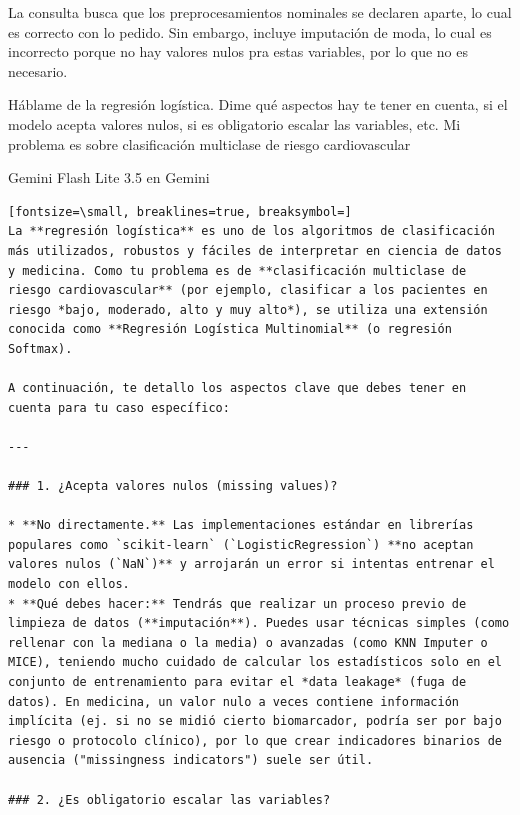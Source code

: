 \documentclass[12pt,a4paper,oneside]{book}
\begin{document}
\begin{iaanalisis}
La consulta busca que los preprocesamientos nominales se declaren aparte, lo cual es correcto con lo pedido. Sin embargo, incluye imputación de moda, lo cual es incorrecto porque no hay valores nulos pra estas variables, por lo que no es necesario.
\end{iaanalisis}




\begin{iaprompt}
Háblame de la regresión logística. Dime qué aspectos hay te tener en cuenta, si el modelo acepta valores nulos, si es obligatorio escalar las variables, etc. Mi problema es sobre clasificación multiclase de riesgo cardiovascular
\end{iaprompt}
\begin{iaresp}{Gemini Flash Lite 3.5 en Gemini}
\begin{Verbatim}[fontsize=\small, breaklines=true, breaksymbol=]
La **regresión logística** es uno de los algoritmos de clasificación más utilizados, robustos y fáciles de interpretar en ciencia de datos y medicina. Como tu problema es de **clasificación multiclase de riesgo cardiovascular** (por ejemplo, clasificar a los pacientes en riesgo *bajo, moderado, alto y muy alto*), se utiliza una extensión conocida como **Regresión Logística Multinomial** (o regresión Softmax).

A continuación, te detallo los aspectos clave que debes tener en cuenta para tu caso específico:

---

### 1. ¿Acepta valores nulos (missing values)?

* **No directamente.** Las implementaciones estándar en librerías populares como `scikit-learn` (`LogisticRegression`) **no aceptan valores nulos (`NaN`)** y arrojarán un error si intentas entrenar el modelo con ellos.
* **Qué debes hacer:** Tendrás que realizar un proceso previo de limpieza de datos (**imputación**). Puedes usar técnicas simples (como rellenar con la mediana o la media) o avanzadas (como KNN Imputer o MICE), teniendo mucho cuidado de calcular los estadísticos solo en el conjunto de entrenamiento para evitar el *data leakage* (fuga de datos). En medicina, un valor nulo a veces contiene información implícita (ej. si no se midió cierto biomarcador, podría ser por bajo riesgo o protocolo clínico), por lo que crear indicadores binarios de ausencia ("missingness indicators") suele ser útil.

### 2. ¿Es obligatorio escalar las variables?


\end{Verbatim}
\end{iaresp}
\end{document}
